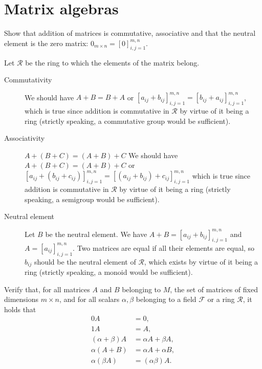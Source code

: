 \section{Matrix algebras}
Show that addition of matrices is commutative, associative and that the neutral element is the zero matrix: $0_{m \times n} = [0]_{i,j=1}^{m,n}$.
\begin{solution}
  Let $\mathcal{R}$ be the ring to which the elements of the matrix belong.
  \begin{description}
    \item[Commutativity]
      We should have $A+B=B+A$ or
      $[a_{ij} + b_{ij}]_{i,j=1}^{m,n} = [b_{ij} + a_{ij}]_{i,j=1}^{m,n}$,
      which is true since addition is commutative in $\mathcal{R}$ by virtue of it being a ring (strictly speaking, a commutative group would be sufficient).
    \item[Associativity] $A+(B+C)=(A+B)+C$
      We should have $A+(B+C)=(A+B)+C$ or
      $[a_{ij} + (b_{ij} + c_{ij})]_{i,j=1}^{m,n} 
      = [(a_{ij} + b_{ij}) + c_{ij}]_{i,j=1}^{m,n}$
      which is true since addition is commutative in $\mathcal{R}$ by virtue of it being a ring (strictly speaking, a semigroup would be sufficient).
    \item[Neutral element] Let $B$ be the neutral element.
      We have
      $A + B = [a_{ij} + b_{ij}]_{i,j=1}^{m,n}$
      and $A = [a_{ij}]_{i,j=1}^{m,n}$.
      Two matrices are equal if all their elements are equal, so $b_{ij}$
      should be the neutral element of $\mathcal{R}$, which exists by virtue of it being a ring (strictly speaking, a monoid would be sufficient).
  \end{description}
\end{solution}

Verify that, for all matrices \(A\) and \(B\) belonging to \(M\), the set of matrices of fixed dimensions \(m \times n\), and for all scalars \(\alpha, \beta\) belonging to a field \(\mathcal{F}\) or a ring \(\mathcal{R}\), it holds that
\begin{align*}
0A &= 0,\\
1A &= A,\\
(\alpha + \beta)A &= \alpha A + \beta A,\\
\alpha(A + B) &= \alpha A + \alpha B,\\
\alpha(\beta A) &= (\alpha \beta) A.
\end{align*}


